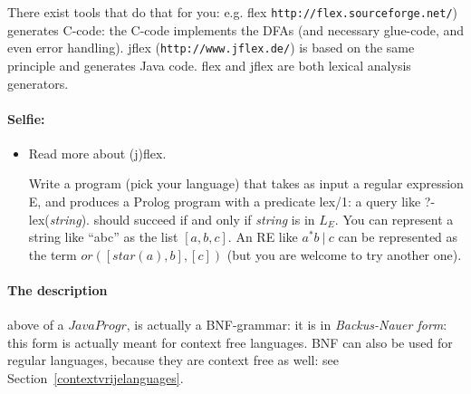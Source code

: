 There exist tools that do that for you: e.g. flex
\verb|http://flex.sourceforge.net/|) generates C-code: the C-code
implements the DFAs (and necessary glue-code, and even error
handling). jflex (\verb|http://www.jflex.de/|) is based on the same principle and generates Java code. flex and jflex are both lexical
analysis generators.

\paragraph{Selfie:}
\begin{itemize}
\item[]
Read more about (j)flex.

Write a program (pick your language) that takes as input a regular
expression E, and produces a Prolog program with a predicate lex/1: a
query like ?- lex({\em string}). should succeed if and only if {\em
  string} is in $L_E$. You can represent a string like ``abc'' as the
list $[a,b,c]$. An RE like $a^*b~|~c$ can be represented as the term
$or([star(a),b],[c])$ (but you are welcome to try another one).
\end{itemize}

\paragraph{The description} above of a $JavaProgr$, is actually a
BNF-grammar: it is in {\em Backus-Nauer form}: this form is actually
meant for context free languages. BNF can also be used for regular
languages, because they are context free as well: see
Section~\ref{contextvrijelanguages}.

